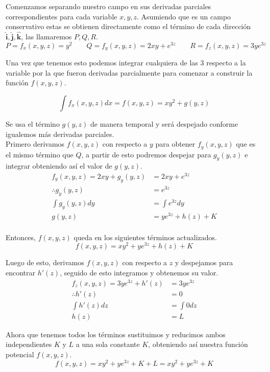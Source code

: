 \documentclass{article}
\begin{document}
Comenzamos separando nuestro campo en sus derivadas parciales correspondientes para cada variable $x,y,z$. 
Asumiendo que es un campo conservativo estas se obtienen directamente como el término de cada dirección 
$\pmb{\hat{i}},\pmb{\hat{j}},\pmb{\hat{k}}$, las llamaremos $P,Q,R$.
\begin{equation*}
    P=f_{x}(x,y,z)=y^2 \qquad Q=f_{y}(x,y,z)=2xy+e^{3z} \qquad R=f_{z}(x,y,z)=3ye^{3z}
\end{equation*}

Una vez que tenemos esto podemos integrar cualquiera de las 3 respecto a la variable por la que fueron 
derivadas parcialmente para comenzar a construir la función $f(x,y,z)$.

\begin{equation*}
    \int f_{x}(x,y,z)dx=f(x,y,z)=xy^2+g(y,z)
\end{equation*}

Se usa el término $g(y,z)$ de manera temporal y será despejado conforme igualemos más derivadas parciales.\\

Primero derivamos $f(x,y,z)$ con respecto a $y$ para obtener $f_{y}(x,y,z)$ que es el mismo término que $Q$, a partir de esto
podremos despejar para $g_{y}(y,z)$ e integrar obteniendo así el valor de $g(y,z)$.
\begin{equation*}
    \begin{split}
        f_{y}(x,y,z)=2xy+g_{y}(y,z)&=2xy+e^{3z} \\
        \therefore g_{y}(y,z)&=e^{3z} \\
        \int g_{y}(y,z)dy&=\int e^{3z}dy\\
        g(y,z)&=ye^{3z}+h(z)+K\\
    \end{split}
\end{equation*}

Entonces, $f(x,y,z)$ queda en los siguientes términos actualizados.
\begin{equation*}
    f(x,y,z)=xy^2+ye^{3z}+h(z)+K
\end{equation*}

Luego de esto, derivamos $f(x,y,z)$ con respecto a $z$ y despejamos para encontrar $h'(z)$, seguido de esto integramos y obtenemos su valor.
\begin{equation*}
    \begin{split}
        f_{z}(x,y,z)=3ye^{3z}+h'(z)&=3ye^{3z}\\
        \therefore h'(z)&=0\\
        \int h'(z)dz&=\int 0dz\\
        h(z)&=L
    \end{split}
\end{equation*}

Ahora que tenemos todos los términos sustituimos y reducimos ambos independientes $K$ y $L$ a una sola constante $K$, obteniendo así nuestra función potencial $f(x,y,z)$.
\begin{equation*}
    f(x,y,z)=xy^2+ye^{3z}+K+L=xy^2+ye^{3z}+K
\end{equation*}
\end{document}
